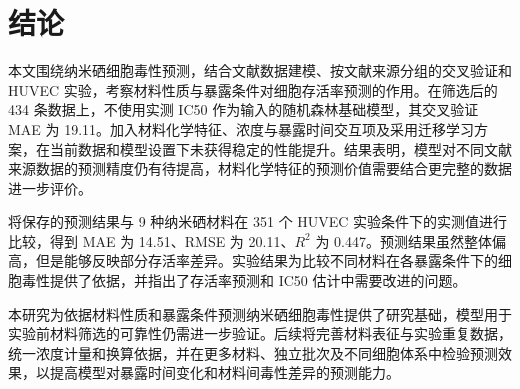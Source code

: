 \section{结论}








本文围绕纳米硒细胞毒性预测，结合文献数据建模、按文献来源分组的交叉验证和 HUVEC 实验，考察材料性质与暴露条件对细胞存活率预测的作用。在筛选后的 434 条数据上，不使用实测 IC50 作为输入的随机森林基础模型，其交叉验证 MAE 为 19.11。加入材料化学特征、浓度与暴露时间交互项及采用迁移学习方案，在当前数据和模型设置下未获得稳定的性能提升。结果表明，模型对不同文献来源数据的预测精度仍有待提高，材料化学特征的预测价值需要结合更完整的数据进一步评价。

将保存的预测结果与 9 种纳米硒材料在 351 个 HUVEC 实验条件下的实测值进行比较，得到 MAE 为 14.51、RMSE 为 20.11、$R^2$ 为 0.447。预测结果虽然整体偏高，但是能够反映部分存活率差异。实验结果为比较不同材料在各暴露条件下的细胞毒性提供了依据，并指出了存活率预测和 IC50 估计中需要改进的问题。

本研究为依据材料性质和暴露条件预测纳米硒细胞毒性提供了研究基础，模型用于实验前材料筛选的可靠性仍需进一步验证。后续将完善材料表征与实验重复数据，统一浓度计量和换算依据，并在更多材料、独立批次及不同细胞体系中检验预测效果，以提高模型对暴露时间变化和材料间毒性差异的预测能力。
